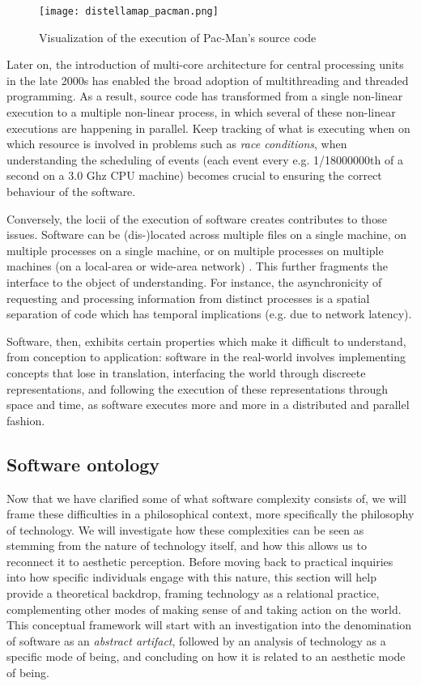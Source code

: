 \begin{figure}
    \texttt{[image: distellamap\_pacman.png]}
    \caption{Visualization of the execution of Pac-Man's source code}
    \label{graphic:pacman-visualization}
\end{figure}

Later on, the introduction of multi-core architecture for central processing units in the late 2000s has enabled the broad adoption of multithreading and threaded programming. As a result, source code has transformed from a single non-linear execution to a multiple non-linear process, in which several of these non-linear executions are happening in parallel. Keep tracking of what is executing when on which resource is involved in problems such as \emph{race conditions}, when understanding the scheduling of events (each event every e.g. 1/18000000th of a second on a 3.0 Ghz CPU machine) becomes crucial to ensuring the correct behaviour of the software.

Conversely, the locii of the execution of software creates contributes to those issues. Software can be (dis-)located across multiple files on a single machine, on multiple processes on a single machine, or on multiple processes on multiple machines (on a local-area or wide-area network) \citep{berry_philosophy_2011}. This further fragments the interface to the object of understanding. For instance, the asynchronicity of requesting and processing information from distinct processes is a spatial separation of code which has temporal implications (e.g. due to network latency).

\spacer

Software, then, exhibits certain properties which make it difficult to understand, from conception to application: software in the real-world involves implementing concepts that lose in translation, interfacing the world through discreete representations, and following the execution of these representations through space and time, as software executes more and more in a distributed and parallel fashion.

\subsection{Software ontology}
\label{subsec:software-ontology}

Now that we have clarified some of what software complexity consists of, we will frame these difficulties in a philosophical context, more specifically the philosophy of technology. We will investigate how these complexities can be seen as stemming from the nature of technology itself, and how this allows us to reconnect it to aesthetic perception. Before moving back to practical inquiries into how specific individuals engage with this nature, this section will help provide a theoretical backdrop, framing technology as a relational practice, complementing other modes of making sense of and taking action on the world. This conceptual framework will start with an investigation into the denomination of software as an \emph{abstract artifact}, followed by an analysis of technology as a specific mode of being, and concluding on how it is related to an aesthetic mode of being.

